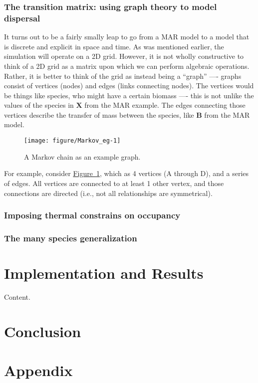 \documentclass{article}\usepackage[]{graphicx}\usepackage[]{color}
\newenvironment{knitrout}{}{} %
\begin{document}
\subsubsection{The transition matrix: using graph theory to model dispersal}
\par
It turns out to be a fairly smally leap to go from a MAR model to a model that is discrete and explicit in space and time. As was mentioned earlier, the simulation will operate on a 2D grid. However, it is not wholly constructive to think of a 2D grid as a matrix upon which we can perform algebraic operations. Rather, it is better to think of the grid as instead being a ``graph'' ---- graphs consist of vertices (nodes) and edges (links connecting nodes). The vertices would be things like species, who might have a certain biomass ---- this is not unlike the values of the species in $\bm{X}$ from the MAR example. The edges connecting those vertices describe the transfer of mass between the species, like $\bm{B}$ from the MAR model.

\begin{knitrout}
\color{fgcolor}\begin{figure}

{\centering \texttt{[image: figure/Markov\_eg-1]} 

}

\caption[A Markov chain as an example graph]{A Markov chain as an example graph.}\label{fig:Markov_eg}
\end{figure}


\end{knitrout}

\par
For example, consider \hyperref[fig:Markov_eg]{Figure~\ref{fig:Markov_eg}}, which as 4 vertices (A through D), and a series of edges. All vertices are connected to at least 1 other vertex, and those connections are directed (i.e., not all relationships are symmetrical).



\subsubsection{Imposing thermal constrains on occupancy}

\subsubsection{The many species generalization}

\section{Implementation and Results}
\label{sec:IandR}
Content.

\section{Conclusion}

\section{Appendix}
\end{document}
